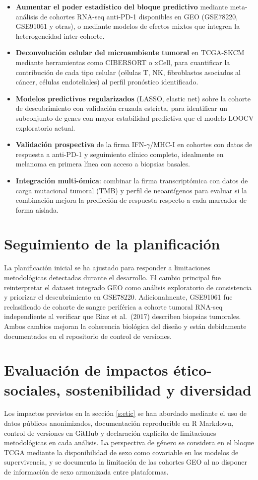 \begin{itemize}
  \item \textbf{Aumentar el poder estadístico del bloque predictivo} mediante meta-análisis de cohortes RNA-seq anti-PD-1 disponibles en GEO (GSE78220, GSE91061 y otras), o mediante modelos de efectos mixtos que integren la heterogeneidad inter-cohorte.
  \item \textbf{Deconvolución celular del microambiente tumoral} en TCGA-SKCM mediante herramientas como CIBERSORT o xCell, para cuantificar la contribución de cada tipo celular (células T, NK, fibroblastos asociados al cáncer, células endoteliales) al perfil pronóstico identificado.
  \item \textbf{Modelos predictivos regularizados} (LASSO, elastic net) sobre la cohorte de descubrimiento con validación cruzada estricta, para identificar un subconjunto de genes con mayor estabilidad predictiva que el modelo LOOCV exploratorio actual.
  \item \textbf{Validación prospectiva} de la firma IFN-$\gamma$/MHC-I en cohortes con datos de respuesta a anti-PD-1 y seguimiento clínico completo, idealmente en melanoma en primera línea con acceso a biopsias basales.
  \item \textbf{Integración multi-ómica}: combinar la firma transcriptómica con datos de carga mutacional tumoral (TMB) y perfil de neoantígenos para evaluar si la combinación mejora la predicción de respuesta respecto a cada marcador de forma aislada.
\end{itemize}

\section{Seguimiento de la planificación}

La planificación inicial se ha ajustado para responder a limitaciones metodológicas detectadas durante el desarrollo. El cambio principal fue reinterpretar el dataset integrado GEO como análisis exploratorio de consistencia y priorizar el descubrimiento en GSE78220. Adicionalmente, GSE91061 fue reclasificado de cohorte de sangre periférica a cohorte tumoral RNA-seq independiente al verificar que Riaz et al.\ (2017) \cite{Riaz2017} describen biopsias tumorales. Ambos cambios mejoran la coherencia biológica del diseño y están debidamente documentados en el repositorio de control de versiones.

\section{Evaluación de impactos ético-sociales, sostenibilidad y diversidad}

Los impactos previstos en la sección \ref{s:etic} se han abordado mediante el uso de datos públicos anonimizados, documentación reproducible en R Markdown, control de versiones en GitHub y declaración explícita de limitaciones metodológicas en cada análisis. La perspectiva de género se considera en el bloque TCGA mediante la disponibilidad de sexo como covariable en los modelos de supervivencia, y se documenta la limitación de las cohortes GEO al no disponer de información de sexo armonizada entre plataformas.
